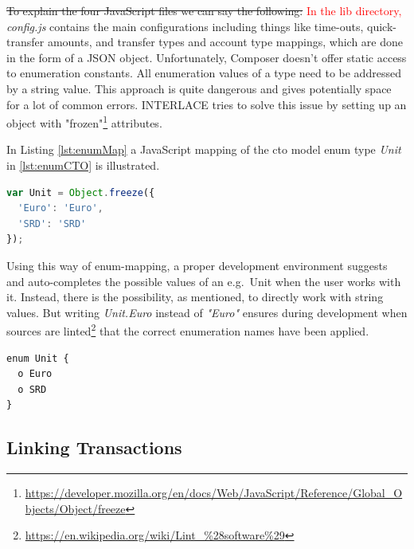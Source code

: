 \st{To explain the four JavaScript files we can say the following:}
\textcolor{red}{In the lib directory,} \textit{config.js} contains the main configurations including things like time-outs, quick-transfer amounts, and transfer types and account type mappings, which are done in the form of a JSON object. Unfortunately, Composer doesn't offer static access to enumeration constants. All enumeration values of a type need to be addressed by a string value. This approach is quite dangerous and gives potentially space for a lot of common errors. INTERLACE tries to solve this issue by setting up an object with "frozen"\footnote{\url{https://developer.mozilla.org/en/docs/Web/JavaScript/Reference/Global_Objects/Object/freeze}} attributes.

In Listing \ref{lst:enumMap} a JavaScript mapping of the cto model enum type \textit{Unit} in \ref{lst:enumCTO} is illustrated.

\begin{center}
\begin{minipage}{0.8\textwidth}
\small
\begin{lstlisting}[language=javascript,firstnumber=1,caption={\bf\small JavaScript enumeration mapping}, captionpos=b,label=lst:enumMap]
var Unit = Object.freeze({
  'Euro': 'Euro',
  'SRD': 'SRD'
});
\end{lstlisting}
\end{minipage}
\end{center}

Using this way of enum-mapping, a proper development environment suggests and auto-completes the possible values of an e.g.\ Unit when the user works with it. Instead, there is the possibility, as mentioned, to directly work with string values. But writing \textit{Unit.Euro} instead of \textit{"Euro"} ensures during development when sources are linted\footnote{\url{https://en.wikipedia.org/wiki/Lint_\%28software\%29}} that the correct enumeration names have been applied.

\begin{center}
\begin{minipage}{0.8\textwidth}
\small
\begin{lstlisting}[language=cto,firstnumber=1,caption={\bf\small enum in CTO-model}, captionpos=b,label=lst:enumCTO]
enum Unit {
  o Euro
  o SRD
}
\end{lstlisting}
\end{minipage}
\end{center}

\subsection{Linking Transactions}
\label{sec:link transactions}

